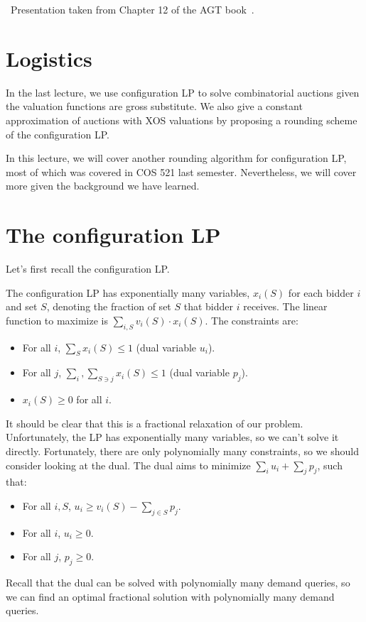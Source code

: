 


\disclaimer ~Presentation taken from Chapter 12 of the AGT book~\cite{AGTbook}.
\section{Logistics}
 In the last lecture, we use configuration LP to solve combinatorial auctions given the valuation functions are gross substitute. We also give a constant approximation of auctions with XOS valuations by proposing a rounding scheme of the configuration LP.
 
In this lecture, we will cover another rounding algorithm for configuration LP, most of which was covered in COS 521 last semester. Nevertheless, we will cover more given the background we have learned. 
\section{The configuration LP}
Let's first recall the configuration LP.

The configuration LP has exponentially many variables, $x_i(S)$ for each bidder $i$ and set $S$, denoting the fraction of set $S$ that bidder $i$ receives. The linear function to maximize is $\sum_{i, S} v_i(S) \cdot  x_i(S) $. The constraints are:
\begin{itemize}
\item For all $i$, $\sum_S x_i(S) \leq 1$ (dual variable $u_i$). 
\item For all $j$, $\sum_i, \sum_{S \ni j} x_i(S) \leq 1$ (dual variable $p_j$). 
\item $x_i(S) \geq 0$ for all $i$.
\end{itemize}

It should be clear that this is a fractional relaxation of our problem. Unfortunately, the LP has exponentially many variables, so we can't solve it directly. Fortunately, there are only polynomially many constraints, so we should consider looking at the dual. The dual aims to minimize $\sum_i u_i + \sum_j p_j$, such that:
\begin{itemize}
\item For all $i, S$, $u_i \geq v_i(S) - \sum_{j \in S} p_j$.
\item For all $i$, $u_i \geq 0$.
\item For all $j$, $p_j \geq 0$. 
\end{itemize}

Recall that the dual can be solved with polynomially many demand queries, so we can find an optimal fractional solution with polynomially many demand queries.


